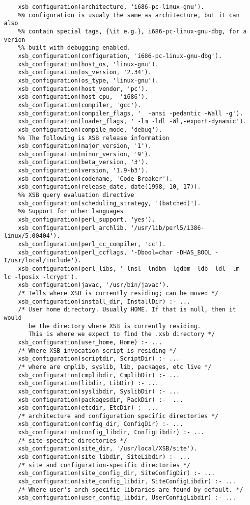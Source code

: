 \begin{description}
\begin{verbatim}
    xsb_configuration(architecture, 'i686-pc-linux-gnu').
    %% configuration is usualy the same as architecture, but it can also
    %% contain special tags, {\it e.g.}, i686-pc-linux-gnu-dbg, for a verion
    %% built with debugging enabled.
    xsb_configuration(configuration, 'i686-pc-linux-gnu-dbg').
    xsb_configuration(host_os, 'linux-gnu').
    xsb_configuration(os_version, '2.34').
    xsb_configuration(os_type, 'linux-gnu').
    xsb_configuration(host_vendor, 'pc').
    xsb_configuration(host_cpu,  'i686').
    xsb_configuration(compiler, 'gcc').
    xsb_configuration(compiler_flags, '  -ansi -pedantic -Wall -g').
    xsb_configuration(loader_flags, ' -lm -ldl -Wl,-export-dynamic').
    xsb_configuration(compile_mode, 'debug').
    %% The following is XSB release information
    xsb_configuration(major_version, '1').
    xsb_configuration(minor_version, '9').
    xsb_configuration(beta_version, '3').
    xsb_configuration(version, '1.9-b3').
    xsb_configuration(codename, 'Code Breaker').
    xsb_configuration(release_date, date(1998, 10, 17)).
    %% XSB query evaluation directive
    xsb_configuration(scheduling_strategy, '(batched)').
    %% Support for other languages
    xsb_configuration(perl_support, 'yes').
    xsb_configuration(perl_archlib, '/usr/lib/perl5/i386-linux/5.00404').
    xsb_configuration(perl_cc_compiler, 'cc').
    xsb_configuration(perl_ccflags, '-Dbool=char -DHAS_BOOL -I/usr/local/include').
    xsb_configuration(perl_libs, '-lnsl -lndbm -lgdbm -ldb -ldl -lm -lc -lposix -lcrypt').
    xsb_configuration(javac, '/usr/bin/javac').
    /* Tells where XSB is currently residing; can be moved */
    xsb_configuration(install_dir, InstallDir) :- ...
    /* User home directory. Usually HOME. If that is null, then it would
       be the directory where XSB is currently residing.
       This is where we expect to find the .xsb directory */
    xsb_configuration(user_home, Home) :- ...
    /* Where XSB invocation script is residing */
    xsb_configuration(scriptdir, ScriptDir) :- ...
    /* where are cmplib, syslib, lib, packages, etc live */
    xsb_configuration(cmplibdir, CmplibDir) :- ...
    xsb_configuration(libdir, LibDir) :- ...
    xsb_configuration(syslibdir, SyslibDir) :- ...
    xsb_configuration(packagesdir, PackDir) :-  ...
    xsb_configuration(etcdir, EtcDir) :- ...
    /* architecture and configuration specific directories */
    xsb_configuration(config_dir, ConfigDir) :- ...
    xsb_configuration(config_libdir, ConfigLibdir) :- ...
    /* site-specific directories */
    xsb_configuration(site_dir, '/usr/local/XSB/site').
    xsb_configuration(site_libdir, SiteLibdir) :- ...
    /* site and configuration-specific directories */
    xsb_configuration(site_config_dir, SiteConfigDir) :- ...
    xsb_configuration(site_config_libdir, SiteConfigLibdir) :- ...
    /* Where user's arch-specific libraries are found by default. */
    xsb_configuration(user_config_libdir, UserConfigLibdir) :- ...
\end{verbatim}


\end{description}
